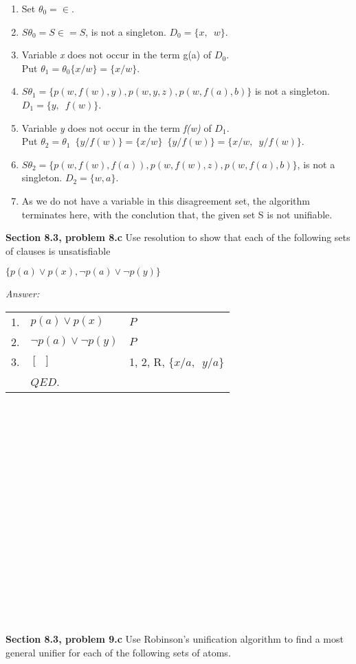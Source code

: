 \documentclass[12pt]{article}
\begin{document}
\begin{enumerate}
    \item Set $\theta_0 = \in$.
    \item $S\theta_0 = S \in = S$, is not a singleton. $D_0 = \{ x,\enspace w \}$.
    \item Variable \emph{x} does not occur in the term g(a) of $D_0$. \\
          Put $\theta_1 = \theta_0 \{ x / w\} = \{ x / w \}$.
    \item $S\theta_1 = \{ p(w,f(w),y),p(w,y,z),p(w,f(a),b) \}$ 
          is not a singleton.$D_1 = \{ y, \enspace f(w) \}$.  
    \item Variable \emph{y} does not occur in the term   \emph{f(w)} of $D_1$. \\ 
          Put $\theta_2 = \theta_1 \enspace \{ y / f(w) \} = \{ x / w \}\enspace \{ y/ f(w) \} = 
          \{ x / w ,\enspace y / f(w)\}$.
    \item $S\theta_2 = \{ p(w,f(w), f(a)), p(w,f(w),z), p(w,f(a),b) \}$, is not a singleton. $D_2 = \{ w,a \}$.
    \item As we do not have a variable in this disagreement set, the algorithm terminates here, 
          with the conclution that, the given set S is not unifiable.
\end{enumerate}

\textbf{Section 8.3, problem 8.c}   Use resolution to show that each of the following sets of clauses is
unsatisfiable

$\{ p(a) \lor p(x), \neg p(a) \lor \neg p(y) \}$

\emph{Answer:} 

\begin{tabular}{p{.8cm}p{8.5cm}l}
1.  & $p(a) \lor p(x)$                & $P$ \\
2.  & $\neg p(a) \lor \neg p(y)$      & $P$ \\
3.  & $[ \enspace ] $                 & 1, 2, R, $\{ x/a, \enspace y/a \}$ \\
& $QED$. \\
\end{tabular}
\\
\\
\\
\\
\\
\\
\\
\\
\\
\\
\\
\\
\\
\\
\\
\\
\\
\textbf{Section 8.3, problem 9.c}   Use Robinson’s unification algorithm to find a most general 
unifier for each of the following sets of atoms.
\end{document}
